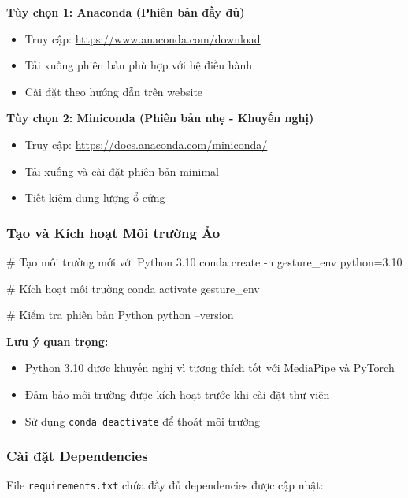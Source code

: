 \textbf{Tùy chọn 1: Anaconda (Phiên bản đầy đủ)}
\begin{itemize}
    \item Truy cập: \url{https://www.anaconda.com/download}
    \item Tải xuống phiên bản phù hợp với hệ điều hành
    \item Cài đặt theo hướng dẫn trên website
\end{itemize}

\textbf{Tùy chọn 2: Miniconda (Phiên bản nhẹ - Khuyến nghị)}
\begin{itemize}
    \item Truy cập: \url{https://docs.anaconda.com/miniconda/}
    \item Tải xuống và cài đặt phiên bản minimal
    \item Tiết kiệm dung lượng ổ cứng
\end{itemize}

\subsubsection{Tạo và Kích hoạt Môi trường Ảo}

\begin{aivncodebox}
\begin{python}
# Tạo môi trường mới với Python 3.10
conda create -n gesture_env python=3.10

# Kích hoạt môi trường  
conda activate gesture_env

# Kiểm tra phiên bản Python
python --version
\end{python}
\end{aivncodebox}

\textbf{Lưu ý quan trọng:}
\begin{itemize}
    \item Python 3.10 được khuyến nghị vì tương thích tốt với MediaPipe và PyTorch
    \item Đảm bảo môi trường được kích hoạt trước khi cài đặt thư viện
    \item Sử dụng \texttt{conda deactivate} để thoát môi trường
\end{itemize}

\subsubsection{Cài đặt Dependencies}

File \texttt{requirements.txt} chứa đầy đủ dependencies được cập nhật:

